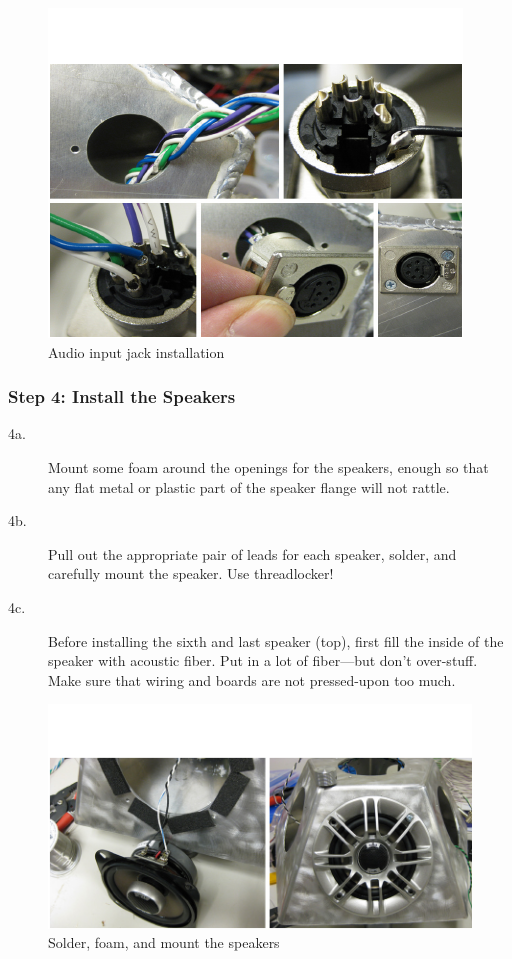 \begin{figure}[t]
\centering
\includegraphics[width=\textwidth]{img-17-eps-converted-to-crop.pdf}
\caption{Audio input jack installation}
\label{Smallwood:img-17}
\end{figure}

\subsubsection{Step 4: Install the Speakers}

\begin{description}
	\item[4a.] Mount some foam around the openings for the speakers, enough so that any
flat metal or plastic part of the speaker flange will not rattle.
	\item[4b.] Pull out the appropriate pair of leads for each speaker, solder, and
carefully mount the speaker. Use threadlocker!
	\item[4c.] Before installing the sixth and last speaker (top), first fill the inside
of the speaker with acoustic fiber. Put in a lot of fiber---but don't over-stuff.
Make sure that wiring and boards are not pressed-upon too much.
\end{description}


\begin{figure}[t]
\centering
\includegraphics[width=\textwidth]{img-18-eps-converted-to-crop.pdf}
\caption{Solder, foam, and mount the speakers}
\label{Smallwood:img-18}
\end{figure}


